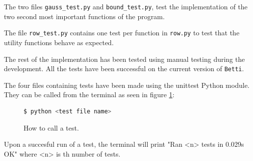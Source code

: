 \documentclass[11pt,a4paper,twoside]{report}
\begin{document}
The two files \texttt{gauss\_test.py} and \texttt{bound\_test.py}, test the implementation of the two second most important functions of the program.

The file \texttt{row\_test.py} contains one test per function in \texttt{row.py} to test that the utility functions behave as expected.

The rest of the implementation has been tested using manual testing during the development. All the tests have been successful on the current version of \texttt{Betti}.

The four files containing tests have been made using the unittest Python module. They can be called from the terminal as seen in figure \ref{fig:how2test}:
\begin{figure}[H]
\begin{lstlisting}[language=bash]
$ python <test file name>
\end{lstlisting}
\caption{How to call a test.}
\label{fig:how2test}
\end{figure}
Upon a succesful run of a test, the terminal will print "Ran <n> tests in 0.029s OK" where <n> is th number of tests.
\end{document}
